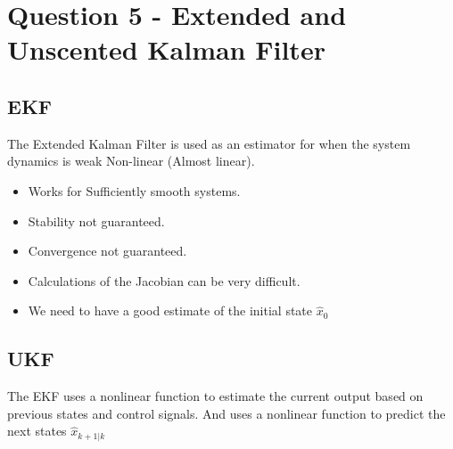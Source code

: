 \chapter{Question 5 - Extended and Unscented Kalman Filter}

\section*{EKF}
The Extended Kalman Filter is used as an estimator for when the system dynamics is weak Non-linear (Almost linear).
\begin{itemize}
        \item Works for Sufficiently smooth systems.
        \item Stability not guaranteed.
        \item Convergence not guaranteed.
        \item Calculations of the Jacobian can be very difficult.
        \item We need to have a good estimate of the initial state $\hat{x}_0$
\end{itemize}


\section*{UKF}


The EKF uses a nonlinear function to estimate the current output based on previous states and control signals. And uses a nonlinear function to predict the next states $\hat{x}_{k+1 \vert k}$
